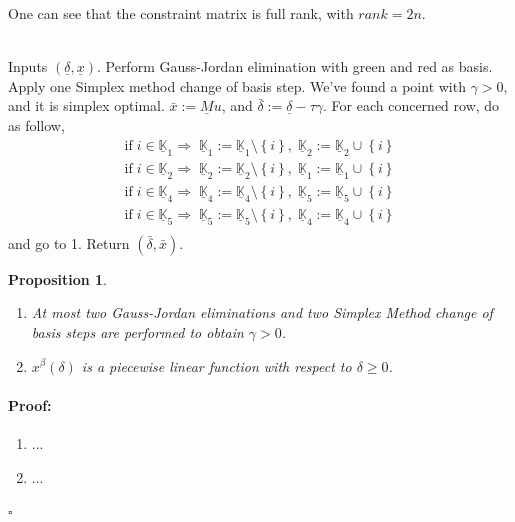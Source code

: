 \documentclass[fleqn]{report} %
\newtheorem{thm}{Proposition}[subsection]
\newenvironment{proof}{\paragraph{Proof:}}{\hfill$\square$}
\begin{document}
One can see that the constraint matrix is full rank, with $rank = 2n$.\\\\

\begin{algorithm}[H]
        \caption{Escaping $\gamma=0$ }
        \label{alg:gamma0}
        \begin{algorithmic}[1] %
	 \State Inputs $(\underline{\delta}, \underline{x})$.
	  \State Perform Gauss-Jordan elimination with green and red as basis.
            \State Apply one Simplex method change of basis step.
	\State  We've found a point with $\gamma>0$, and it is simplex optimal.
	\State $\bar{x}:=\underline{M}u$, and $\bar{\delta}:=\underline{\delta}-\tau\gamma$.
	\Else
	\State  For each concerned row, do as follow, 
		\[
		\begin{array}{l}
		\text{if}\;i\in\underline{\mathbb{K}}_1\Rightarrow\;\underline{\mathbb{K}}_1:=\underline{\mathbb{K}}_1\setminus\left\{i\right\},\;\underline{\mathbb{K}}_2:=\underline{\mathbb{K}}_2\cup\left\{i\right\}\\
		\text{if}\;i\in\underline{\mathbb{K}}_2\Rightarrow\;\underline{\mathbb{K}}_2:=\underline{\mathbb{K}}_2\setminus\left\{i\right\},\;\underline{\mathbb{K}}_1:=\underline{\mathbb{K}}_1\cup\left\{i\right\}\\
		\text{if}\;i\in\underline{\mathbb{K}}_4\Rightarrow\;\underline{\mathbb{K}}_4:=\underline{\mathbb{K}}_4\setminus\left\{i\right\},\;\underline{\mathbb{K}}_5:=\underline{\mathbb{K}}_5\cup\left\{i\right\}\\
		\text{if}\;i\in\underline{\mathbb{K}}_5\Rightarrow\;\underline{\mathbb{K}}_5:=\underline{\mathbb{K}}_5\setminus\left\{i\right\},\;\underline{\mathbb{K}}_4:=\underline{\mathbb{K}}_4\cup\left\{i\right\}\\
		\end{array} 
		\]
	\State and go to 1.
	\EndIf
	\State Return $(\bar{\delta}, \bar{x})$.
        \end{algorithmic}
    \end{algorithm}

\begin{thm}
\begin{enumerate}
\item At most two Gauss-Jordan eliminations  and two Simplex Method change of basis steps are performed to obtain $\gamma>0$.
\item $x^{\beta}(\delta)$ is a piecewise linear function with respect to $\delta\geq 0$.
\end{enumerate}
\end{thm}
\begin{proof}
\begin{enumerate}
\item ...
\item ...
\end{enumerate}
\end{proof}
\end{document}
